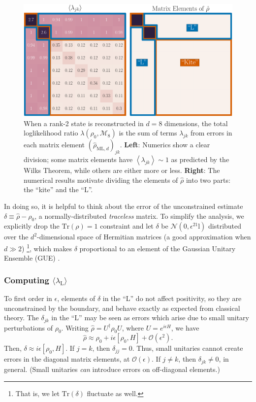 \documentclass[aps,pra, twocolumn]{revtex4-1}
\newcommand{\Tr}{\mathrm{Tr}}
\newcommand{\Id}{\mathbb{I}}
\newcommand{\expect}[1]{\ensuremath{\left\langle#1\right\rangle}}
\def\Id{1\!\mathrm{l}}
\newcommand{\rhohat}{\hat{\rho}}
\newcommand{\rhoML}[1]{\rhohat_{\scriptscriptstyle{\mathrm{ML},#1}}}
\begin{document}
\begin{figure}[h]
\includegraphics[width=\columnwidth]{Images/Figure_2.pdf}
 \caption{When a rank-2 state is reconstructed in $d=8$ dimensions, the total loglikelihood ratio $\lambda(\rho_0,\mathcal{M}_8)$ is the sum of terms $\lambda_{jk}$ from errors in each matrix element $(\rhoML{d})_{jk}$.  \textbf{Left}:  Numerics show a clear division; some matrix elements have $\expect{\lambda_{jk}}\sim1$ as predicted by the Wilks Theorem, while others are either more or less. \textbf{Right}:  The numerical results motivate dividing the elements of $\rhohat$ into two parts: the ``kite'' and the ``L''.}
\label{fig:L}
\end{figure}

In doing so, it is helpful to think about the error of the unconstrained estimate $\delta \equiv \hat\rho- \rho_{0}$, a normally-distributed \emph{traceless} matrix.  To simplify the analysis, we explicitly drop the $\Tr(\rho)=1$ constraint and let $\delta$ be $\mathcal{N}(0,\epsilon^2\Id)$ distributed over the $d^2$-dimensional space of Hermitian matrices (a good approximation when $d\gg2$) \footnote{That is, we let $\mathrm{Tr}(\delta)$ fluctuate as well.}, which makes $\delta$ proportional to an element of the Gaussian Unitary Ensemble (GUE) \cite{Fyodorov2005}.

\subsubsection{Computing $\langle \lambda_\mathrm{L}\rangle$}

To first order in $\epsilon$, elements of $\delta$ in the ``L'' do not affect positivity, so they are unconstrained by the boundary, and behave exactly as expected from classical theory. The $\delta_{jk}$ in the ``L'' may be seen as errors which arise due to small unitary perturbations of $\rho_{0}$. Writing $\rhohat = U^{\dagger}\rho_{0}U$, where $U=e^{i\epsilon H}$, we have
\[\rhohat \approx \rho_{0} + i\epsilon [\rho_{0},H]+\mathcal{O}(\epsilon^{2}).\]
Then, $\delta \approx i\epsilon [\rho_{0},H]$.
If $j = k$, then $\delta_{jj} = 0$. Thus, small unitaries cannot create errors in the diagonal matrix elements, at $\mathcal{O}(\epsilon)$. If $j \neq k$, then $\delta_{jk} \neq 0$, in general. (Small unitaries \emph{can} introduce errors on off-diagonal elements.)
\end{document}
